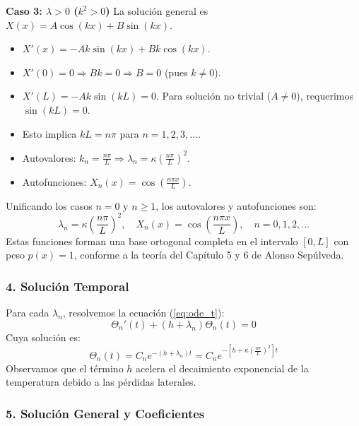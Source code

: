 \documentclass[a4paper]{article}
\begin{document}
\textbf{Caso 3: $\lambda > 0$ ($k^2 > 0$)}
La solución general es $X(x) = A \cos(kx) + B \sin(kx)$.
\begin{itemize}
    \item $X'(x) = -Ak \sin(kx) + Bk \cos(kx)$.
    \item $X'(0) = 0 \Rightarrow Bk = 0 \Rightarrow B = 0$ (pues $k \neq 0$).
    \item $X'(L) = -Ak \sin(kL) = 0$. Para solución no trivial ($A \neq 0$), requerimos $\sin(kL) = 0$.
    \item Esto implica $kL = n\pi$ para $n = 1, 2, 3, \dots$.
    \item Autovalores: $k_n = \frac{n\pi}{L} \Rightarrow \lambda_n = \kappa \left(\frac{n\pi}{L}\right)^2$.
    \item Autofunciones: $X_n(x) = \cos\left(\frac{n\pi x}{L}\right)$.
\end{itemize}

Unificando los casos $n=0$ y $n \geq 1$, los autovalores y autofunciones son:
\begin{equation}
\lambda_n = \kappa \left(\frac{n\pi}{L}\right)^2, \quad X_n(x) = \cos\left(\frac{n\pi x}{L}\right), \quad n = 0, 1, 2, \dots
\end{equation}
Estas funciones forman una base ortogonal completa en el intervalo $[0, L]$ con peso $p(x)=1$, conforme a la teoría del Capítulo 5 y 6 de Alonso Sepúlveda.

\subsubsection{4. Solución Temporal}

Para cada $\lambda_n$, resolvemos la ecuación (\ref{eq:ode_t}):
\begin{equation}
\Theta_n'(t) + (h + \lambda_n)\Theta_n(t) = 0
\end{equation}
Cuya solución es:
\begin{equation}
\Theta_n(t) = C_n e^{-(h + \lambda_n)t} = C_n e^{-\left[h + \kappa \left(\frac{n\pi}{L}\right)^2\right]t}
\end{equation}
Observamos que el término $h$ acelera el decaimiento exponencial de la temperatura debido a las pérdidas laterales.

\subsubsection{5. Solución General y Coeficientes}
\end{document}
